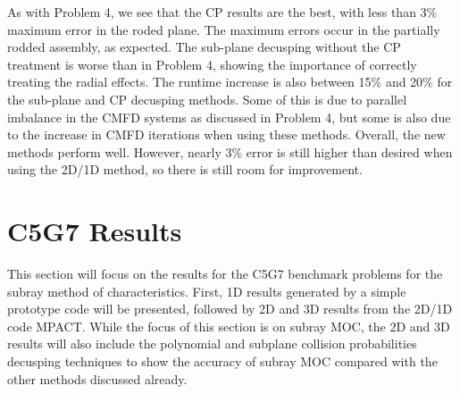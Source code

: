 \begin{table}[h]
\centering
\caption[VERA Problem 5 Decusping Results]{VERA Problem 5 decusping results for the partially rodded plane}\label{t:p5decusp}
\end{table}

As with Problem 4, we see that the CP results are the best, with less than 3\% maximum error in the roded plane.  The maximum errors occur in the partially rodded assembly, as expected.  The sub-plane decusping without the CP treatment is worse than in Problem 4, showing the importance of correctly treating the radial effects.  The runtime increase is also between 15\% and 20\% for the sub-plane and CP decusping methods.  Some of this is due to parallel imbalance in the CMFD systems as discussed in Problem 4, but some is also due to the increase in CMFD iterations when using these methods.  Overall, the new methods perform well.  However, nearly 3\% error is still higher than desired when using the 2D/1D method, so there is still room for improvement.

\section{C5G7 Results}

This section will focus on the results for the C5G7 benchmark problems for the subray method of characteristics.  First, 1D results generated by a simple prototype code will be presented, followed by 2D and 3D results from the 2D/1D code MPACT.  While the focus of this section is on subray MOC, the 2D and 3D results will also include the polynomial and subplane collision probabilities decusping techniques to show the accuracy of subray MOC compared with the other methods discussed already.

